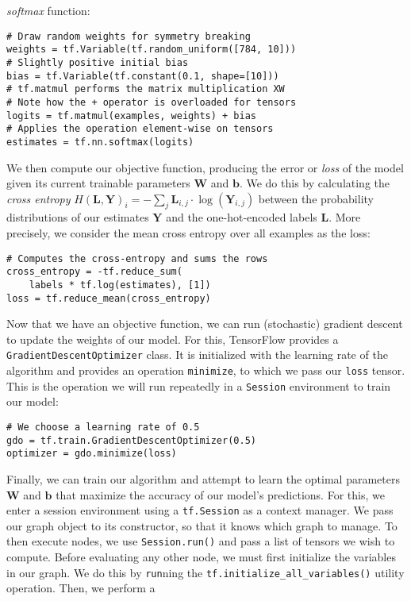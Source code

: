 \emph{softmax} function:
%
\begin{lstlisting}
# Draw random weights for symmetry breaking
weights = tf.Variable(tf.random_uniform([784, 10]))
# Slightly positive initial bias
bias = tf.Variable(tf.constant(0.1, shape=[10]))
# tf.matmul performs the matrix multiplication XW
# Note how the + operator is overloaded for tensors
logits = tf.matmul(examples, weights) + bias
# Applies the operation element-wise on tensors
estimates = tf.nn.softmax(logits)
\end{lstlisting}
%
We then compute our objective function, producing the error or \emph{loss} of
the model given its current trainable parameters $\mathbf{W}$ and
$\mathbf{b}$. We do this by calculating the \emph{cross entropy}
$H(\mathbf{L}, \mathbf{Y})_i = -\sum_j \mathbf{L}_{i,j} \cdot
\log(\mathbf{Y}_{i,j})$ between the probability distributions of our estimates
$\mathbf{Y}$ and the one-hot-encoded labels $\mathbf{L}$. More precisely, we
consider the mean cross entropy over all examples as the loss:
%
\begin{lstlisting}
# Computes the cross-entropy and sums the rows
cross_entropy = -tf.reduce_sum(
    labels * tf.log(estimates), [1])
loss = tf.reduce_mean(cross_entropy)
\end{lstlisting}
%
Now that we have an objective function, we can run (stochastic) gradient descent
to update the weights of our model. For this, TensorFlow provides a
\texttt{GradientDescentOptimizer} class. It is initialized with the
learning rate of the algorithm and provides an operation \texttt{minimize}, to
which we pass our \texttt{loss} tensor. This is the operation we will run
repeatedly in a \texttt{Session} environment to train our model:
%
\begin{lstlisting}
# We choose a learning rate of 0.5
gdo = tf.train.GradientDescentOptimizer(0.5)
optimizer = gdo.minimize(loss)
\end{lstlisting}
%
Finally, we can train our algorithm and attempt to learn the optimal parameters
$\mathbf{W}$ and $\mathbf{b}$ that maximize the accuracy of our model's
predictions. For this, we enter a session environment using a
\texttt{tf.Session} as a context manager. We pass our graph object to its
constructor, so that it knows which graph to manage. To then execute nodes, we
use \texttt{Session.run()} and pass a list of tensors we wish to compute. Before
evaluating any other node, we must first initialize the variables in our
graph. We do this by \texttt{run}ning the
\texttt{tf.initialize\_all\_variables()} utility operation. Then, we perform a
